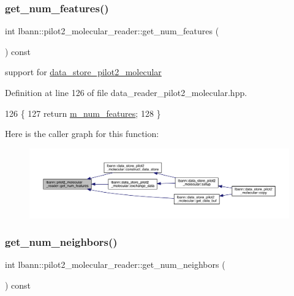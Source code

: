 \subsubsection{\texorpdfstring{get\+\_\+num\+\_\+features()}{get\_num\_features()}}
{\footnotesize\ttfamily int lbann\+::pilot2\+\_\+molecular\+\_\+reader\+::get\+\_\+num\+\_\+features (\begin{DoxyParamCaption}{ }\end{DoxyParamCaption}) const\hspace{0.3cm}{\ttfamily [inline]}}



support for \hyperlink{classlbann_1_1data__store__pilot2__molecular}{data\+\_\+store\+\_\+pilot2\+\_\+molecular} 



Definition at line 126 of file data\+\_\+reader\+\_\+pilot2\+\_\+molecular.\+hpp.


\begin{DoxyCode}
126                                \{
127     \textcolor{keywordflow}{return} \hyperlink{classlbann_1_1pilot2__molecular__reader_a7fd7dac6f280fd8ef92bd5d2ffc89e36}{m\_num\_features};
128   \}  
\end{DoxyCode}
Here is the caller graph for this function\+:\nopagebreak
\begin{figure}[H]
\begin{center}
\leavevmode
\includegraphics[width=350pt]{classlbann_1_1pilot2__molecular__reader_ad4fcb0da3f6964cbe24de4feac3f5f4a_icgraph}
\end{center}
\end{figure}
\mbox{\label{classlbann_1_1pilot2__molecular__reader_a7c379056841cda42247ff518270bcfdf}} 
\subsubsection{\texorpdfstring{get\+\_\+num\+\_\+neighbors()}{get\_num\_neighbors()}}
{\footnotesize\ttfamily int lbann\+::pilot2\+\_\+molecular\+\_\+reader\+::get\+\_\+num\+\_\+neighbors (\begin{DoxyParamCaption}{ }\end{DoxyParamCaption}) const\hspace{0.3cm}{\ttfamily [inline]}}



